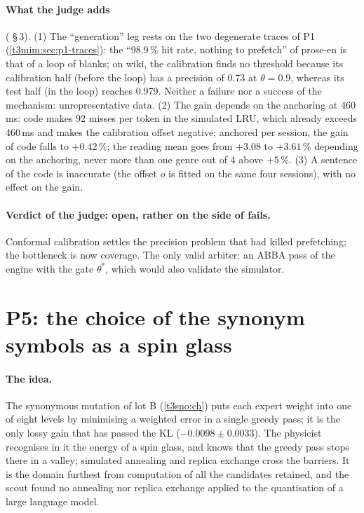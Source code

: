 \paragraph{What the judge adds} ( §\,3). (1) The ``generation'' leg rests on the two degenerate traces of P1 (\cref{t3mim:sec:p1-traces}): the ``98.9\,\% hit rate, nothing to prefetch'' of prose-en is that of a loop of blanks; on wiki, the calibration finds no threshold because its calibration half (before the loop) has a precision of 0.73 at $\theta = 0.9$, whereas its test half (in the loop) reaches 0.979. Neither a failure nor a success of the mechanism: unrepresentative data. (2) The gain depends on the anchoring at 460\,ms: code makes 92 misses per token in the simulated LRU, which already exceeds 460\,ms and makes the calibration offset negative; anchored per session, the gain of code falls to $+0.42\,\%$; the reading mean goes from $+3.08$ to $+3.61\,\%$ depending on the anchoring, never more than one genre out of 4 above $+5\,\%$. (3) A sentence of the code is inaccurate (the offset $o$ is fitted on the same four sessions), with no effect on the gain.

\paragraph{Verdict of the judge: open, rather on the side of fails.} Conformal calibration settles the precision problem that had killed prefetching; the bottleneck is now coverage. The only valid arbiter: an ABBA pass of the engine with the gate $\theta^\ast$, which would also validate the simulator.

\section{P5: the choice of the synonym symbols as a spin glass}\label{t3mim:sec:p5}

\paragraph{The idea.} The synonymous mutation of lot B (\cref{t3sno:ch}) puts each expert weight into one of eight levels by minimising a weighted error in a single greedy pass; it is the only lossy gain that has passed the KL ($-0.0098 \pm 0.0033$). The physicist recognises in it the energy of a spin glass, and knows that the greedy pass stops there in a valley; simulated annealing \cite{kirkpatrick1983} and replica exchange \cite{hukushima1996} cross the barriers. It is the domain furthest from computation of all the candidates retained, and the scout found no annealing nor replica exchange applied to the quantisation of a large language model.

